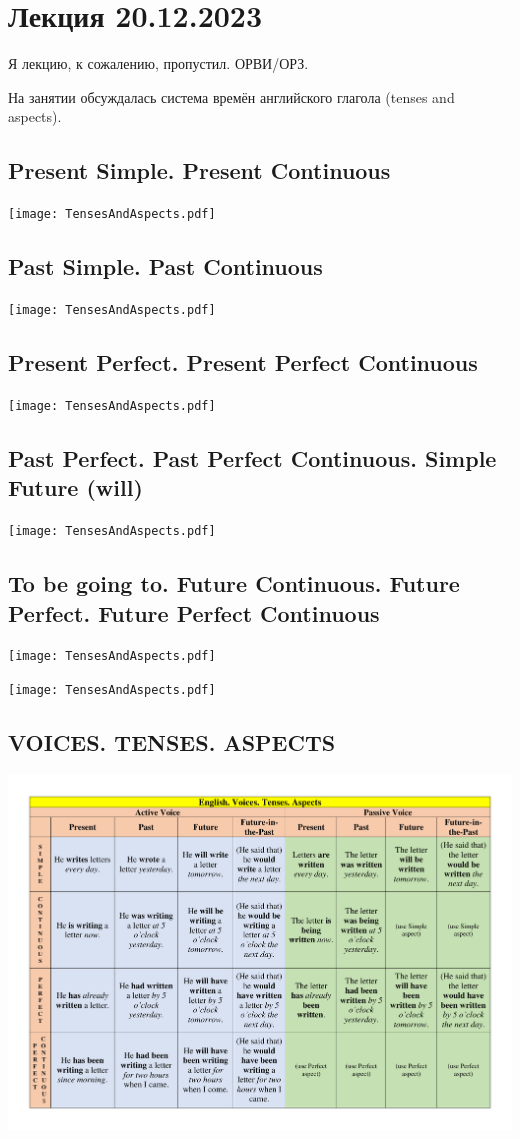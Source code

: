\documentclass[main.tex]{subfiles}
\begin{document}
\section{Лекция 20.12.2023}

Я лекцию, к сожалению, пропустил. ОРВИ/ОРЗ.

На занятии обсуждалась система времён английского глагола (tenses and aspects).

\subsection{Present Simple. Present Continuous}
\vspace{-10mm}
{\parindent-20pt\texttt{[image: TensesAndAspects.pdf]}}\newpage

\subsection{Past Simple. Past Continuous}
\vspace{-5mm}
{\parindent-20pt\texttt{[image: TensesAndAspects.pdf]}}\newpage

\subsection{Present Perfect. Present Perfect Continuous}
\vspace{-5mm}
{\parindent-20pt\texttt{[image: TensesAndAspects.pdf]}}\newpage

\subsection{Past Perfect. Past Perfect Continuous. Simple Future (will)}
\vspace{-5mm}
{\parindent-20pt\texttt{[image: TensesAndAspects.pdf]}}\newpage

\subsection{To be going to. Future Continuous. Future Perfect. Future Perfect Continuous}
\vspace{-5mm}
{\parindent-20pt\texttt{[image: TensesAndAspects.pdf]}}\newpage

{\parindent-20pt\texttt{[image: TensesAndAspects.pdf]}}

\subsection{VOICES. TENSES. ASPECTS}

{\parindent0pt\includegraphics[width=\textwidth,page=1,trim={0.5in 0in 0.49in 0in},clip=true]{EnglishTensesAspectsVoicesPoster.pdf}}
\end{document}
